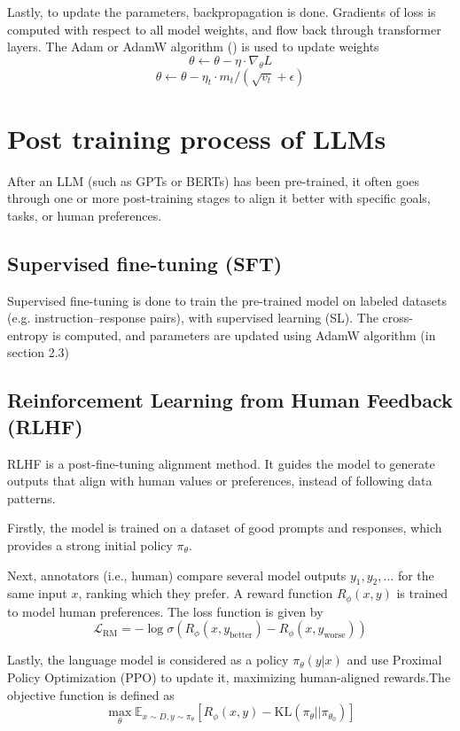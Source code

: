 \documentclass{article} %
\begin{document}
Lastly, to update the parameters, backpropagation is done. Gradients of loss is computed with respect to all model weights, and flow back through transformer layers. The Adam or AdamW algorithm (\cite{loshchilov2017decoupled}) is used to update weights
\[
    \theta \leftarrow \theta - \eta \cdot \nabla_\theta L
    \]
\[
    {\theta} \leftarrow {\theta} - \eta_t \cdot {m}_t / (\sqrt{{v}_t} + \epsilon)
    \]


\section{Post training process of LLMs}
After an LLM (such as GPTs or BERTs) has been pre-trained, it often goes through one or more post-training stages to align it better with specific goals, tasks, or human preferences. 

\subsection{Supervised fine-tuning (SFT)}
Supervised fine-tuning is done to train the pre-trained model on labeled datasets (e.g. instruction–response pairs), with supervised learning (SL). The cross-entropy is computed, and parameters are updated using AdamW algorithm (in section 2.3)

\subsection{Reinforcement Learning from Human Feedback (RLHF)}
RLHF is a post-fine-tuning alignment method. It guides the model to generate outputs that align with human values or preferences, instead of following data patterns.

Firstly, the model is trained on a dataset of good prompts and responses, which provides a strong initial policy $\pi_\theta$. 

Next, annotators (i.e., human) compare several model outputs $y_1, y_2, \ldots$ for the same input $x$, ranking which they prefer. A reward function $R_{\phi}(x, y)$ is trained to model human preferences. The loss function is given by 
\[
\mathcal{L}_{\text{RM}} = -\log\sigma(R_{\phi}(x, y_{\text{better}}) - R_{\phi}(x, y_{\text{worse}}))
\]

Lastly, the language model is considered as a policy $\pi_\theta(y|x)$ and use Proximal Policy Optimization (PPO) to update it, maximizing human-aligned rewards.The objective function is defined as 
\[
\max_{\theta} \mathbb{E}_{x \sim D, y \sim \pi_\theta}[R_\phi(x, y) - \text{KL}(\pi_\theta||\pi_{\theta_0})]
\]




\end{document}
